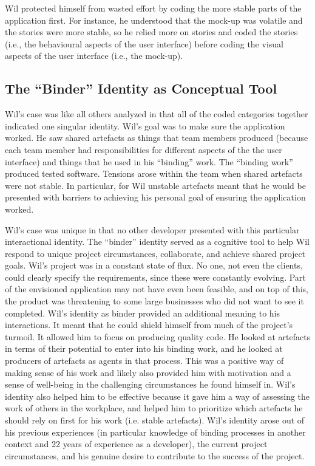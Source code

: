 \documentclass{chi2009}
\begin{document}
Wil protected himself from wasted effort by coding the more stable parts of the application first. For instance, he understood that the mock-up was volatile and the stories were more stable, so he relied more on stories and coded the stories (i.e., the behavioural aspects of the user interface) before coding the visual aspects of the user interface (i.e., the mock-up). 

\subsection{The ``Binder'' Identity as Conceptual Tool}
Wil's case was like all others analyzed in that all of the coded categories together indicated one singular identity. Wil's goal was to make sure the application worked. He saw shared artefacts as things that team members produced (because each team member had responsibilities for different aspects of the the user interface) and things that he used in his ``binding'' work. The ``binding work'' produced tested software. Tensions arose within the team when shared artefacts were not stable.  In particular, for Wil unstable artefacts meant that he would be presented with barriers to achieving his personal goal of ensuring the application worked. 

Wil's case was unique in that no other developer presented with this particular interactional identity. The ``binder'' identity served as a cognitive tool to help Wil respond to unique project circumstances, collaborate, and achieve shared project goals. Wil's project was in a constant state of flux.  No one, not even the clients, could clearly specify the requirements, since these were constantly evolving. Part of the envisioned application may not have even been feasible, and on top of this, the product was threatening to some large businesses who did not want to see it completed. Wil's identity as binder provided an additional meaning to his interactions.  It meant that he could shield himself from much of the project's turmoil.  It allowed him to focus on producing quality code.  He looked at artefacts in terms of their potential to enter into his binding work, and he looked at producers of artefacts as agents in that process. This was a positive way of making sense of his work and likely also provided him with motivation and a sense of well-being in the challenging circumstances he found himself in. Wil's identity also helped him to be effective because it gave him a way of assessing the work of others in the workplace, and helped him to prioritize which artefacts he should rely on first for his work (i.e. stable artefacts). Wil's identity arose out of his previous experiences (in particular knowledge of binding processes in another context and 22 years of experience as a developer), the current project circumstances, and his genuine desire to contribute to the success of the project. 
\end{document}
